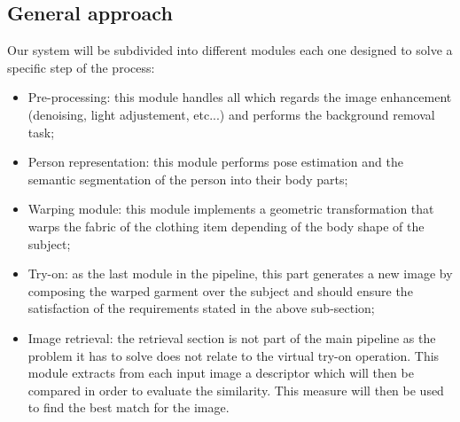 \begin{multicols}{2}
\subsection{General approach}
Our system will be subdivided into different modules each one designed to solve a specific step of the process:
\begin{itemize}
\item Pre-processing: this module handles all which regards the image enhancement (denoising, light adjustement, etc...) and performs the background removal task;

\item Person representation: this module performs pose estimation and the semantic segmentation of the person into their body parts;

\item Warping module: this module implements a geometric transformation that warps the fabric of the clothing item depending of the body shape of the subject;


\item Try-on: as the last module in the pipeline, this part generates a new image by composing the warped garment over the subject and should ensure the satisfaction of the requirements stated in the above sub-section;

\item Image retrieval: the retrieval section is not part of the main pipeline as the problem it has to solve does not relate to the virtual try-on operation. This module extracts from each input image a descriptor which will then be compared in order to evaluate the similarity. This measure will then be used to find the best match for the image.
\end{itemize}


\end{multicols}